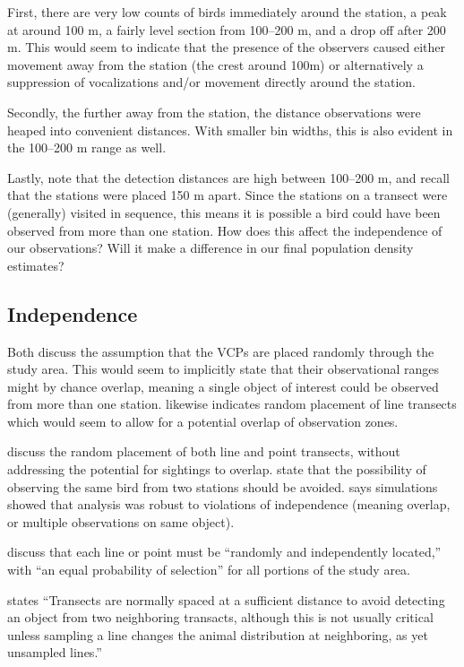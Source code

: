 \documentclass[12pt]{article}
\begin{document}
First, there are very low counts of birds immediately around the station, a peak at around 100 m, a fairly level section from 100--200 m, and a drop off after 200 m. This would seem to indicate that the presence of the observers caused either movement away from the station (the crest around 100m) or alternatively a suppression of vocalizations and/or movement directly around the station. 

Secondly, the further away from the station, the distance observations were heaped into convenient distances. With smaller bin widths, this is also evident in the 100--200 m range as well.

Lastly, note that the detection distances are high between 100--200 m, and recall that the stations were placed 150 m apart. Since the stations on a transect were (generally) visited in sequence, this means it is possible a bird could have been observed from more than one station. How does this affect the independence of our observations? Will it make a difference in our final population density estimates?

\subsection{Independence}
Both \textcite{ramsey1979,buckland1987} discuss the assumption that the VCPs are placed randomly through the study area. This would seem to implicitly state that their observational ranges might by chance overlap, meaning a single object of interest could be observed from more than one station.  \textcite[240]{thompson2012} likewise indicates random placement of line transects which would seem to allow for a potential overlap of observation zones. 

\textcite{buckland2001} discuss the random placement of both line and point transects, without addressing the potential for sightings to overlap. \textcite{reynolds1980} state that the possibility of observing the same bird from two stations should be avoided. \textcite{buckland2006} says simulations showed that analysis was robust to violations of independence (meaning overlap, or multiple observations on same object).

\textcite[233]{buckland2001} discuss that each line or point must be ``randomly and independently located,'' with ``an equal probability of selection'' for all portions of the study area.

\textcite[235]{buckland2001} states ``Transects are normally spaced at a sufficient distance to avoid detecting an object from two neighboring transacts, although this is not usually critical unless sampling a line changes the animal distribution at neighboring, as yet unsampled lines.''
\end{document}
